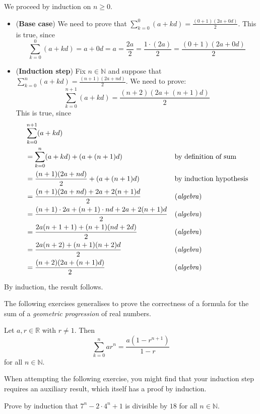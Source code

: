 \begin{cproof}
We proceed by induction on $n \ge 0$.
\begin{itemize}
\item (\textbf{Base case}) We need to prove that $\displaystyle\sum_{k=0}^0 (a+kd) = \frac{(0+1)(2a+0d)}{2}$. This is true, since
\[ \sum_{k=0}^0 (a+kd) = a + 0d = a = \frac{2a}{2} = \frac{1 \cdot (2a)}{2} = \frac{(0+1)(2a+0d)}{2} \]

\item (\textbf{Induction step}) Fix $n \in \mathbb{N}$ and suppose that $\displaystyle\sum_{k=0}^n (a+kd) = \frac{(n+1)(2a+nd)}{2}$. We need to prove:
\[ \sum_{k=0}^{n+1} (a+kd) = \frac{(n+2)(2a+(n+1)d)}{2} \]
This is true, since
\begin{align*}
&\sum_{k=0}^{n+1} (a+kd) && \\
&= \sum_{k=0}^n (a+kd) + (a+(n+1)d) && \text{by definition of sum} \\
&= \frac{(n+1)(2a+nd)}{2} + (a + (n+1)d) && \text{by induction hypothesis} \\
&= \frac{(n+1)(2a+nd) + 2a + 2(n+1)d}{2} && \text{(\textit{algebra})} \\
&= \frac{(n+1) \cdot 2a + (n+1) \cdot nd + 2a + 2(n+1)d}{2} && \text{(\textit{algebra})} \\
&= \frac{2a(n+1+1) + (n+1)(nd + 2d)}{2} && \text{(\textit{algebra})} \\
&= \frac{2a(n+2) + (n+1)(n+2)d}{2} && \text{(\textit{algebra})} \\
&= \frac{(n+2)(2a + (n+1)d)}{2} && \text{(\textit{algebra})}
\end{align*}
\end{itemize}
By induction, the result follows.
\end{cproof}

The following exercises generalises  to prove the correctness of a formula for the sum of a \textit{geometric progression} of real numbers.

\begin{exercise}
\label{exFormulaForGeometricProgression}
Let $a,r \in \mathbb{R}$ with $r \ne 1$. Then
\[ \sum_{k=0}^n ar^n = \frac{a(1-r^{n+1})}{1-r} \]
for all $n \in \mathbb{N}$.
\end{exercise}

When attempting the following exercise, you might find that your induction step requires an auxiliary result, which itself has a proof by induction.

\begin{exercise}
Prove by induction that $7^n - 2 \cdot 4^n + 1$ is divisible by $18$ for all $n \in \mathbb{N}$.
\end{exercise}

